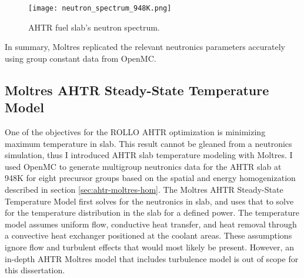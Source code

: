  \begin{figure}[H]
    \centering
    \texttt{[image: neutron\_spectrum\_948K.png]}
    \caption{AHTR fuel slab's neutron spectrum.}  
    \label{fig:neutron_spectrum_948K}
\end{figure}

In summary, Moltres replicated the relevant neutronics parameters accurately 
using group constant data from OpenMC. %

\subsection{Moltres AHTR Steady-State Temperature Model}
One of the objectives for the ROLLO AHTR optimization is minimizing maximum 
temperature in slab. 
This result cannot be gleaned from a neutronics simulation, thus I introduced 
AHTR slab temperature modeling with Moltres.
I used OpenMC to generate multigroup neutronics data for the AHTR slab at 948K 
for eight precursor groups based on the spatial and energy homogenization 
described in section \ref{sec:ahtr-moltres-hom}.
The Moltres AHTR Steady-State Temperature Model first solves for the neutronics 
in slab, and uses that to solve for the temperature distribution in the slab 
for a defined power. 
The temperature model assumes uniform flow, conductive heat transfer, and heat 
removal through a convective heat exchanger positioned at the coolant areas. 
These assumptions ignore flow and turbulent effects that would most likely be 
present. 
However, an in-depth AHTR Moltres model that includes turbulence model is 
out of scope for this dissertation. 

